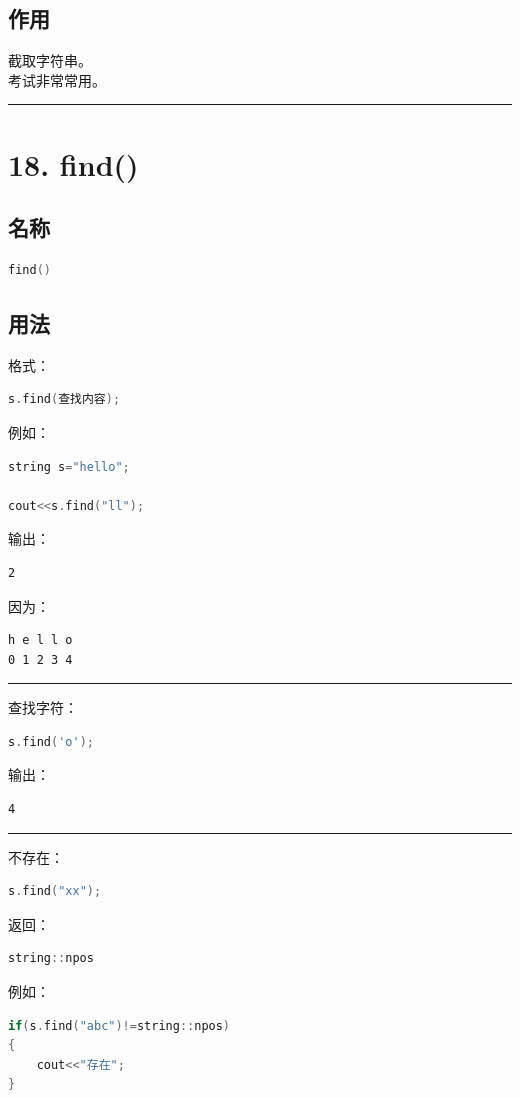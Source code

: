 \documentclass[10pt,twocolumn]{extarticle}
\begin{document}
\subsection{作用}
截取字符串。\\
考试非常常用。

\noindent\rule{\linewidth}{0.4pt}

\section{18. find()}

\subsection{名称}
\begin{lstlisting}[language=C++]
find()
\end{lstlisting}

\subsection{用法}
格式：
\begin{lstlisting}[language=C++]
s.find(查找内容);
\end{lstlisting}
例如：
\begin{lstlisting}[language=C++]
string s="hello";

cout<<s.find("ll");
\end{lstlisting}
输出：
\begin{lstlisting}
2
\end{lstlisting}
因为：
\begin{lstlisting}
h e l l o
0 1 2 3 4
\end{lstlisting}

\noindent\rule{\linewidth}{0.4pt}

查找字符：
\begin{lstlisting}[language=C++]
s.find('o');
\end{lstlisting}
输出：
\begin{lstlisting}
4
\end{lstlisting}

\noindent\rule{\linewidth}{0.4pt}

不存在：
\begin{lstlisting}[language=C++]
s.find("xx");
\end{lstlisting}
返回：
\begin{lstlisting}[language=C++]
string::npos
\end{lstlisting}
例如：
\begin{lstlisting}[language=C++]
if(s.find("abc")!=string::npos)
{
    cout<<"存在";
}
\end{lstlisting}
\end{document}
